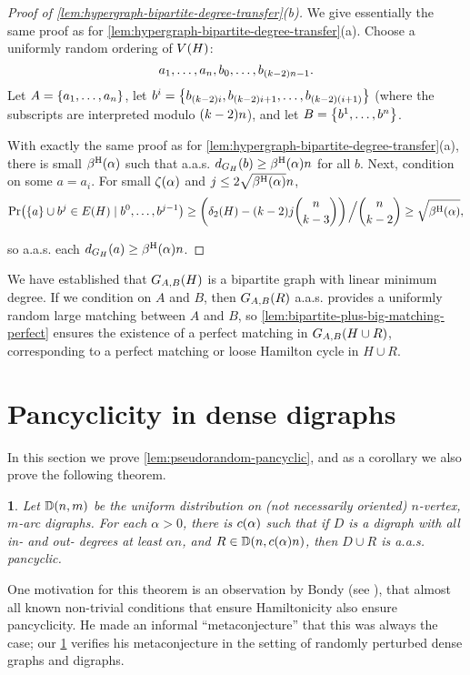 \documentclass[11pt,english]{article}
\theoremstyle{plain}
\newtheorem{thm}{\protect\theoremname}
\theoremstyle{definition}
\theoremstyle{definition}
\theoremstyle{plain}
\theoremstyle{plain}
\theoremstyle{plain}
\theoremstyle{plain}
\theoremstyle{remark}
\theoremstyle{remark}
\let\originalleft\left
\let\originalright\right
\renewcommand{\left}{\mathopen{}\mathclose\bgroup\originalleft}
\renewcommand{\right}{\aftergroup\egroup\originalright}
\providecommand{\theoremname}{Theorem}
\begin{document}
\begin{proof}
[Proof of \ref{lem:hypergraph-bipartite-degree-transfer}(b)]We give
essentially the same proof as for \ref{lem:hypergraph-bipartite-degree-transfer}(a).
Choose a uniformly random ordering of $V\left(H\right)$:
\[
a_{1},\dots,a_{n},b_{0},\dots,b_{\left(k-2\right)n-1}.
\]
Let $A=\left\{ a_{1},\dots,a_{n}\right\} $, let $b^{i}=\left\{ b_{\left(k-2\right)i},b_{\left(k-2\right)i+1},\dots,b_{\left(k-2\right)\left(i+1\right)}\right\} $
(where the subscripts are interpreted modulo $\left(k-2\right)n$),
and let $B=\left\{ b^{1},\dots,b^{n}\right\} $.

With exactly the same proof as for \ref{lem:hypergraph-bipartite-degree-transfer}(a),
there is small $\aham\left(\alpha\right)$ such that a.a.s. $d_{G_{H}}\left(b\right)\ge\aham\left(\alpha\right)n$
for all $b$. Next, condition on some $a=a_{i}$. For small $\zeta\left(\alpha\right)$
and $j\le2\sqrt{\aham\left(\alpha\right)}n$,
\[
\Pr\left(\left\{ a\right\} \cup b^{j}\in E\left(H\right)\mid b^{0},\dots,b^{j-1}\right)\ge\left(\delta_{2}\left(H\right)-\left(k-2\right)j{n \choose k-3}\right)\left.\vphantom{\sum}\right/{n \choose k-2}\ge\sqrt{\aham\left(\alpha\right)},
\]


so a.a.s. each $d_{G_{H}}\left(a\right)\ge\aham\left(\alpha\right)n$.
\end{proof}
We have established that $G_{A,B}\left(H\right)$ is a bipartite graph
with linear minimum degree. If we condition on $A$ and $B$, then
$G_{A,B}\left(R\right)$ a.a.s. provides a uniformly random large
matching between $A$ and $B$, so \ref{lem:bipartite-plus-big-matching-perfect}
ensures the existence of a perfect matching in $G_{A,B}\left(H\cup R\right)$,
corresponding to a perfect matching or loose Hamilton cycle in $H\cup R$.


\section{\label{sec:digraphs}Pancyclicity in dense digraphs}

In this section we prove \ref{lem:pseudorandom-pancyclic}, and as
a corollary we also prove the following theorem.
\begin{thm}
\label{thm:smoothed-pancyclic}Let $\DD\left(n,m\right)$ be the uniform
distribution on (not necessarily oriented) $n$-vertex, $m$-arc digraphs.
For each $\alpha>0$, there is $\cdi\left(\alpha\right)$ such that
if $D$ is a digraph with all in- and out- degrees at least $\alpha n$,
and $R\in\DD\left(n,\cdi\left(\alpha\right)n\right)$, then $D\cup R$
is a.a.s. pancyclic.
\end{thm}
One motivation for this theorem is an observation by Bondy (see \cite{Bon75}),
that almost all known non-trivial conditions that ensure Hamiltonicity
also ensure pancyclicity. He made an informal ``metaconjecture''
that this was always the case; our \ref{thm:smoothed-pancyclic} verifies
his metaconjecture in the setting of randomly perturbed dense graphs
and digraphs.
\end{document}
